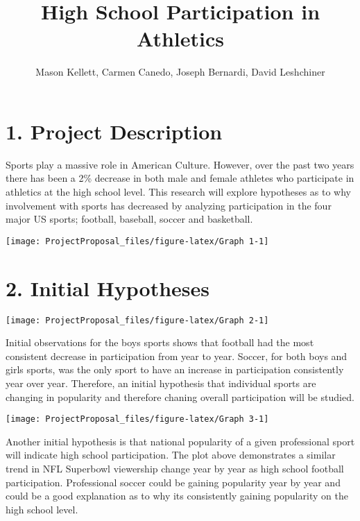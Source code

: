\documentclass[
]{article}
\title{High School Participation in Athletics}
\author{Mason Kellett, Carmen Canedo, Joseph Bernardi, David Leshchiner}
\date{}
\begin{document}
\maketitle

\hypertarget{project-description}{%
\section{1. Project Description}\label{project-description}}

Sports play a massive role in American Culture. However, over the past
two years there has been a 2\% decrease in both male and female athletes
who participate in athletics at the high school level. This research
will explore hypotheses as to why involvement with sports has decreased
by analyzing participation in the four major US sports; football,
baseball, soccer and basketball.

\begin{center}\texttt{[image: ProjectProposal\_files/figure-latex/Graph 1-1]} \end{center}

\hypertarget{initial-hypotheses}{%
\section{2. Initial Hypotheses}\label{initial-hypotheses}}

\begin{center}\texttt{[image: ProjectProposal\_files/figure-latex/Graph 2-1]} \end{center}

Initial observations for the boys sports shows that football had the
most consistent decrease in participation from year to year. Soccer, for
both boys and girls sports, was the only sport to have an increase in
participation consistently year over year. Therefore, an initial
hypothesis that individual sports are changing in popularity and
therefore chaning overall participation will be studied.

\begin{center}\texttt{[image: ProjectProposal\_files/figure-latex/Graph 3-1]} \end{center}

Another initial hypothesis is that national popularity of a given
professional sport will indicate high school participation. The plot
above demonstrates a similar trend in NFL Superbowl viewership change
year by year as high school football participation. Professional soccer
could be gaining popularity year by year and could be a good explanation
as to why its consistently gaining popularity on the high school level.
\end{document}
